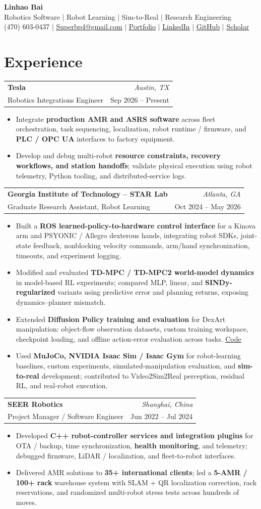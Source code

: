 \documentclass[letterpaper,11pt]{article}
\makeatletter
\newcommand{\rhead}[4]{\vspace{2pt}\noindent\begin{tabular*}{\textwidth}{l@{\extracolsep{\fill}}r}\textbf{#1} & \textit{#2} \\[-1pt] {\small #3} & {\small #4}\end{tabular*}\vspace{-5pt}}
\newcommand{\entry}[1]{\item\small{#1}}
\newcommand{\blist}{\begin{itemize}[leftmargin=0.19in,topsep=3pt,itemsep=2pt,parsep=0pt,partopsep=0pt]}
\newcommand{\elist}{\end{itemize}\vspace{0pt}}
\newcommand{\hyper}[2]{\href{#1}{\underline{#2}}}
\makeatother
\begin{document}
\begin{center}
  {\Huge\textbf{Linhao Bai}}\\[3pt]
  {\normalsize Robotics Software $\vert$ Robot Learning $\vert$ Sim-to-Real $\vert$ Research Engineering}\\[4pt]
  {\small (470) 603-0437 $\vert$ \hyper{mailto:Superbp4@gmail.com}{Superbp4@gmail.com} $\vert$
  \hyper{https://marvelousp4.github.io/}{Portfolio} $\vert$
  \hyper{https://linkedin.com/in/linhaobai}{LinkedIn} $\vert$
  \hyper{https://github.com/Marvelousp4}{GitHub} $\vert$
  \hyper{https://scholar.google.com/citations?user=MAtZMRIAAAAJ}{Scholar}}
\end{center}
\vspace{-8pt}

\section{Experience}
\rhead{Tesla}{Austin, TX}{Robotics Integrations Engineer}{Sep 2026 -- Present}
\blist
 \entry{Integrate \textbf{production AMR and ASRS software} across fleet orchestration, task sequencing, localization, robot runtime / firmware, and \textbf{PLC / OPC UA} interfaces to factory equipment.}
 \entry{Develop and debug multi-robot \textbf{resource constraints, recovery workflows, and station handoffs}; validate physical execution using robot telemetry, Python tooling, and distributed-service logs.}
\elist
\rhead{Georgia Institute of Technology -- STAR Lab}{Atlanta, GA}{Graduate Research Assistant, Robot Learning}{Oct 2024 -- May 2026}
\blist
 \entry{Built a \textbf{ROS learned-policy-to-hardware control interface} for a Kinova arm and PSYONIC / Allegro dexterous hands, integrating robot SDKs, joint-state feedback, nonblocking velocity commands, arm/hand synchronization, timeouts, and experiment logging.}
 \entry{Modified and evaluated \textbf{TD-MPC / TD-MPC2 world-model dynamics} in model-based RL experiments; compared MLP, linear, and \textbf{SINDy-regularized} variants using predictive error and planning returns, exposing dynamics--planner mismatch.}
 \entry{Extended \textbf{Diffusion Policy training and evaluation} for DexArt manipulation: object-flow observation datasets, custom training workspace, checkpoint loading, and offline action-error evaluation across tasks. \hyper{https://github.com/Marvelousp4/diffusion_policy}{Code}}
 \entry{Used \textbf{MuJoCo, NVIDIA Isaac Sim / Isaac Gym} for robot-learning baselines, custom experiments, simulated-manipulation evaluation, and \textbf{sim-to-real} development; contributed to Video2Sim2Real perception, residual RL, and real-robot execution.}
\elist
\rhead{SEER Robotics}{Shanghai, China}{Project Manager / Software Engineer}{Jun 2022 -- Jul 2024}
\blist
 \entry{Developed \textbf{C++ robot-controller services and integration plugins} for OTA / backup, time synchronization, \textbf{health monitoring}, and telemetry; debugged firmware, LiDAR / localization, and fleet-to-robot interfaces.}
 \entry{Delivered AMR solutions to \textbf{35+ international clients}; led a \textbf{5-AMR / 100+ rack} warehouse system with SLAM + QR localization correction, rack reservations, and randomized multi-robot stress tests across hundreds of moves.}
\elist
\end{document}
